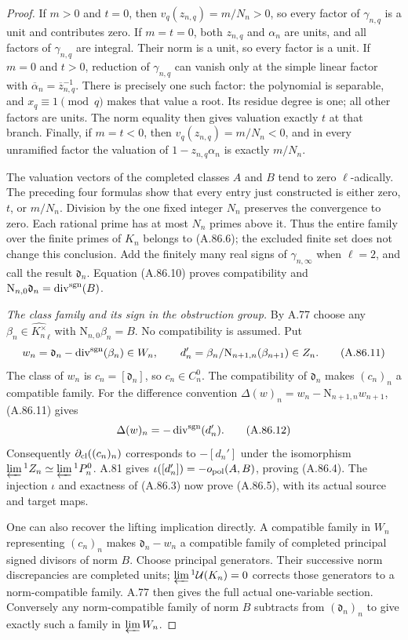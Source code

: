 \begin{proof}
If $m>0$ and $t=0$, then $v_q(z_{n,q})=m/N_n>0$, so every
factor of $\gamma_{n,q}$ is a unit and contributes zero.
If $m=t=0$, both $z_{n,q}$ and $\alpha_n$ are units, and all
factors of $\gamma_{n,q}$ are integral.  Their norm is a unit,
so every factor is a unit.
If $m=0$ and $t>0$, reduction of $\gamma_{n,q}$ can vanish
only at the simple linear factor with
$\overline\alpha_n=\overline z_{n,q}^{-1}$.
There is precisely one such factor: the polynomial is separable,
and $x_q\equiv1\pmod q$ makes that value a root.
Its residue degree is one; all other factors are units.  The
norm equality then gives valuation exactly $t$ at that branch.
Finally, if $m=t<0$, then $v_q(z_{n,q})=m/N_n<0$, and in every
unramified factor the valuation of $1-z_{n,q}\alpha_n$ is
exactly $m/N_n$.

The valuation vectors of the completed classes $A$ and $B$
tend to zero $\ell$-adically.  The preceding four formulas show
that every entry just constructed is either zero, $t$, or
$m/N_n$.  Division by the one fixed integer $N_n$ preserves
the convergence to zero.  Each rational prime has at most
$N_n$ primes above it.  Thus the entire family over the finite
primes of $K_n$ belongs to (A.86.6); the excluded finite set
does not change this conclusion.  Add the finitely many real
signs of $\gamma_{n,\infty}$ when $\ell=2$, and call the result
$\mathfrak d_n$.  Equation (A.86.10) proves compatibility and
$\mathrm N_{n,0}\mathfrak d_n=\operatorname{div}^{\rm sgn}(B)$.

\emph{The class family and its sign in the obstruction group.}
By A.77 choose any $\beta_n\in\widehat{K_n^\times}_\ell$
with $\mathrm N_{n,0}\beta_n=B$.  No compatibility is assumed.
Put
\[
 w_n=\mathfrak d_n-\operatorname{div}^{\rm sgn}(\beta_n)
                \in W_n,\qquad
 d_n'=\beta_n/\mathrm N_{n+1,n}(\beta_{n+1})\in Z_n.
 \tag{A.86.11}
\]
The class of $w_n$ is $c_n=[\mathfrak d_n]$, so $c_n\in C_n^0$.
The compatibility of $\mathfrak d_n$ makes $(c_n)_n$ a
compatible family.  For the difference convention
$\Delta(w)_n=w_n-\mathrm N_{n+1,n}w_{n+1}$, (A.86.11) gives
\[
                  \Delta(w)_n
                         =-\operatorname{div}^{\rm sgn}(d_n').
 \tag{A.86.12}
\]
Consequently $\partial_{\rm cl}((c_n)_n)$ corresponds to
$-[d_n']$ under the isomorphism
$\varprojlim{}^1 Z_n\simeq\varprojlim{}^1P_n^0$.
A.81 gives $\iota([d_n'])=-o_{\rm pol}(A,B)$, proving
(A.86.4).  The injection $\iota$ and exactness of (A.86.3)
now prove (A.86.5), with its actual source and target maps.

One can also recover the lifting implication directly.
A compatible family in $W_n$ representing $(c_n)_n$ makes
$\mathfrak d_n-w_n$ a compatible family of completed principal
signed divisors of norm $B$.  Choose principal generators.
Their successive norm discrepancies are completed units;
$\varprojlim{}^1\mathcal U(K_n)=0$ corrects those generators
to a norm-compatible family.  A.77 then gives the full actual
one-variable section.  Conversely any norm-compatible family
of norm $B$ subtracts from $(\mathfrak d_n)_n$ to give exactly
such a family in $\varprojlim W_n$.
\end{proof}

